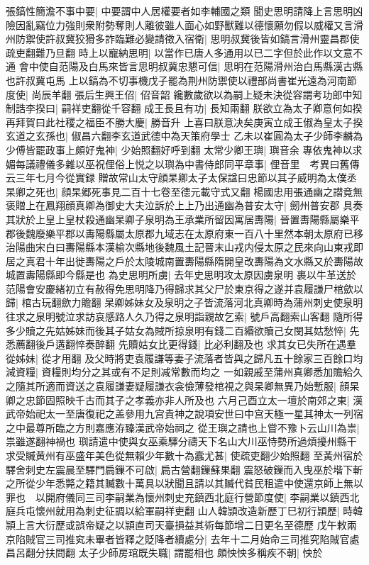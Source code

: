 張鎬性簡澹不事中要|{
	中要謂中人居權要者如李輔國之類}
聞史思明請降上言思明凶險因亂竊位力強則衆附勢奪則人離彼雖人面心如野獸難以德懷願勿假以威權又言滑州防禦使許叔冀狡猾多詐臨難必變請徵入宿衛|{
	思明叔冀後皆如鎬言滑州靈昌郡使疏吏翻難乃旦翻}
時上以寵納思明|{
	以當作已唐人多通用以已二字但於此作以文意不通}
會中使自范陽及白馬來皆言思明叔冀忠懇可信|{
	思明在范陽滑州治白馬縣漢古縣也許叔冀屯馬}
上以鎬為不切事機戊子罷為荆州防禦使以禮部尚書崔光遠為河南節度使|{
	尚辰羊翻}
張后生興王佋|{
	佋音韶}
纔數歲欲以為嗣上疑未決從容謂考功郎中知制誥李揆曰|{
	嗣祥吏翻從千容翻}
成王長且有功|{
	長知兩翻}
朕欲立為太子卿意何如揆再拜賀曰此社稷之福臣不勝大慶|{
	勝音升}
上喜曰朕意决矣庚寅立成王俶為皇太子揆玄道之玄孫也|{
	俶昌六翻李玄道武德中為天策府學士}
乙未以崔圓為太子少師李麟為少傅皆罷政事上頗好鬼神|{
	少始照翻好呼到翻}
太常少卿王璵|{
	璵音余}
專依鬼神以求媚每議禮儀多雜以巫祝俚俗上悦之以璵為中書侍郎同平章事|{
	俚音里　考異曰舊傳云三年七月今從實録}
贈故常山太守顔杲卿太子太保諡曰忠節以其子威明為太僕丞杲卿之死也|{
	顔杲郷死事見二百十七卷至德元載守式又翻}
楊國忠用張通幽之譛竟無褒贈上在鳳翔顔真卿為御史大夫泣訴於上上乃出通幽為普安太守|{
	劒州普安郡}
具奏其狀於上皇上皇杖殺通幽杲卿子泉明為王承業所留因寓居夀陽|{
	晉置夀陽縣屬樂平郡後魏廢樂平郡以夀陽縣屬太原郡九域志在太原府東一百八十里然本朝太原府已移治陽曲宋白曰夀陽縣本漢榆次縣地後魏風土記晉末山戎内侵太原之民來向山東戎即居之真君十年出徙夀陽之戶於太陵城南置夀陽縣隋開皇改夀陽為文水縣又於夀陽故城置夀陽縣即今縣是也}
為史思明所虜|{
	去年史思明攻太原因虜泉明}
裹以牛革送於范陽會安慶緒初立有赦得免思明降乃得歸求其父尸於東京得之遂并袁履謙尸棺歛以歸|{
	棺古玩翻歛力贍翻}
杲卿姊妹女及泉明之子皆流落河北真卿時為蒲州刺史使泉明往求之泉明號泣求訪哀感路人久乃得之泉明詣親故乞索|{
	號戶高翻索山客翻}
隨所得多少贖之先姑姊妹而後其子姑女為賊所掠泉明有錢二百緡欲贖己女閔其姑愁悴|{
	先悉薦翻後戶遘翻悴奏醉翻}
先贖姑女比更得錢|{
	比必利翻及也}
求其女已失所在遇羣從姊妹|{
	從才用翻}
及父時將吏袁履謙等妻子流落者皆與之歸凡五十餘家三百餘口均減資糧|{
	資糧則均分之其或有不足則减常數而均之}
一如親戚至蒲州真卿悉加贍給久之隨其所適而資送之袁履謙妻疑履謙衣衾儉薄發棺視之與杲卿無異乃始慙服|{
	顔杲卿之忠節固照映千古而其子之孝義亦非人所及也}
六月己酉立太一壇於南郊之東|{
	漢武帝始祀太一至唐復祀之盖參用九宫貴神之說項安世曰中宫天極一星其神太一列宿之中最尊所臨之方則嘉應洊臻漢武帝始祠之}
從王璵之請也上嘗不豫卜云山川為祟|{
	祟雖遂翻神禍也}
璵請遣中使與女巫乘驛分禱天下名山大川巫恃勢所過煩擾州縣干求受贓黄州有巫盛年美色從無賴少年數十為蠧尤甚|{
	使疏吏翻少始照翻}
至黃州宿於驛舍刺史左震晨至驛門扃鏁不可啟|{
	扃古營翻鏁蘇果翻}
震怒破鏁而入曳巫於堦下斬之所從少年悉斃之籍其贓數十萬具以狀聞且請以其贓代貧民租遣中使還京師上無以罪也　以開府儀同三司李嗣業為懷州刺史充鎮西北庭行營節度使|{
	李嗣業以鎮西北庭兵屯懷州就用為刺史征調以給軍嗣祥吏翻}
山人韓頴改造新歷丁巳初行頴歷|{
	時韓頴上言大衍歷或誤帝疑之以頴直司天臺損益其術每節增二日更名至德歷}
戊午敕兩京陷賊官三司推䆒未畢者皆釋之貶降者續處分|{
	去年十二月始命三司推究陷賊官處昌呂翻分扶問翻}
太子少師房琯既失職|{
	謂罷相也}
頗怏怏多稱疾不朝|{
	怏於}


